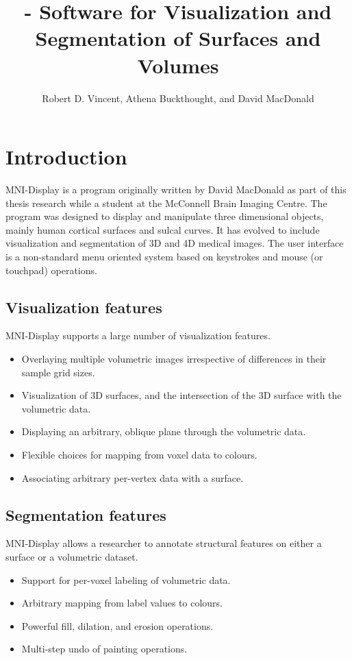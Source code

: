 \documentclass[11pt,letterpaper]{article}
\title{{\bf \display} - Software for Visualization and Segmentation of Surfaces and Volumes}
\author{Robert D. Vincent, Athena Buckthought, and David MacDonald}
\newcommand{\display}{\mbox{MNI-Display}}
\begin{document}
\maketitle

\setcounter{tocdepth}{2}
\tableofcontents

\newpage

\section{Introduction}

\display{} is a program originally written by David MacDonald as part of
this thesis research while a student at the McConnell Brain Imaging
Centre. The program was designed to display and manipulate three
dimensional objects, mainly human cortical surfaces and sulcal
curves. It has evolved to include visualization and segmentation of 3D
and 4D medical images. The user interface is a non-standard menu
oriented system based on keystrokes and mouse (or touchpad) operations.

\subsection{Visualization features}
\display{} supports a large number of visualization features.
\begin{itemize}
\item Overlaying multiple volumetric images irrespective of differences in their sample grid sizes.
\item Visualization of 3D surfaces, and the intersection of the 3D surface with the volumetric data.
\item Displaying an arbitrary, oblique plane through the volumetric data.
\item Flexible choices for mapping from voxel data to colours.
\item Associating arbitrary per-vertex data with a surface.
\end{itemize}

\subsection{Segmentation features}
\display{} allows a researcher to annotate structural features on either a surface or a volumetric dataset.
\begin{itemize}
\item Support for per-voxel labeling of volumetric data.
\item Arbitrary mapping from label values to colours.
\item Powerful fill, dilation, and erosion operations.
\item Multi-step undo of painting operations.
\end{itemize}
\end{document}
